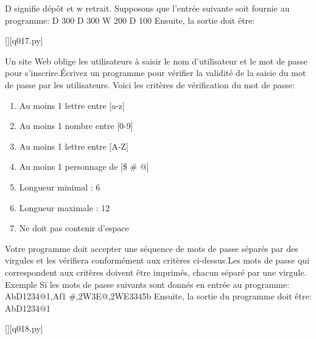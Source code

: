 D signifie dépôt et w retrait.\newline
Supposons que l'entrée suivante soit fournie au programme:\newline
D 300\newline
D 300\newline
W 200\newline
D 100\newline
Ensuite, la sortie doit être:
\renewcommand{\nomfichier}{q017.py}
\begin{solution}
    \pythonfile{\chemincode \nomfichier}[][\nomfichier]
\end{solution}

\question
Un site Web oblige les utilisateurs à saisir le nom d'utilisateur et le mot de passe pour s'inscrire.Écrivez un programme pour vérifier la validité de la saisie du mot de passe par les utilisateurs.\newline
Voici les critères de vérification du mot de passe:
\begin{enumerate}
	\item Au moins 1 lettre entre [a-z]
	\item Au moins 1 nombre entre [0-9]
	\item Au moins 1 lettre entre [A-Z]
	\item Au moins 1 personnage de [\$ \# @]
	\item Longueur minimal : 6
	\item Longueur maximale : 12
	\item Ne doit pas contenir d'espace
\end{enumerate}
Votre programme doit accepter une séquence de mots de passe séparés par des virgules et les vérifiera conformément aux critères ci-dessus.Les mots de passe qui correspondent aux critères doivent être imprimés, chacun séparé par une virgule.\newline
Exemple\newline
Si les mots de passe suivants sont donnés en entrée au programme:\newline
AbD1234@1,Af1 \#,2W3E@,2WE3345b\newline
Ensuite, la sortie du programme doit être:\newline
AbD1234@1

\renewcommand{\nomfichier}{q018.py}
\begin{solution}
    \pythonfile{\chemincode \nomfichier}[][\nomfichier]
\end{solution}

